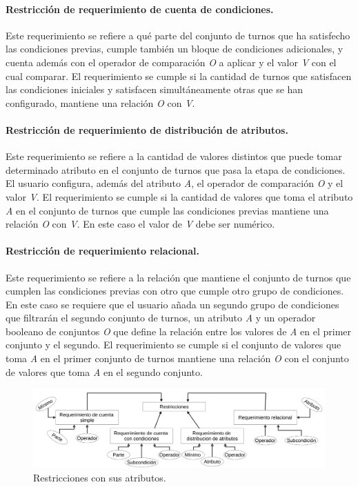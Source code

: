 \paragraph{Restricción de requerimiento de cuenta de condiciones.} Este requerimiento se refiere a qué parte del conjunto de turnos que ha 
 satisfecho las condiciones previas, cumple también un bloque de condiciones adicionales, y cuenta además con el operador de comparación \textit{O} a aplicar y el valor \textit{V} con el cual comparar. El requerimiento se cumple si la cantidad de turnos que satisfacen las condiciones iniciales y satisfacen simultáneamente otras que se han configurado, mantiene una relación \textit{O} con \textit{V}.

\paragraph{Restricción de requerimiento de distribución de atributos.} Este requerimiento se refiere a la cantidad de valores distintos que puede tomar determinado atributo en el conjunto de turnos que pasa la etapa de condiciones. El usuario configura, además del atributo \textit{A}, el operador de comparación \textit{O} y el valor \textit{V}. El requerimiento se cumple si la cantidad de valores que toma el atributo \textit{A} en el conjunto de turnos que cumple las condiciones previas mantiene una relación \textit{O} con  \textit{V}. En este caso el valor de \textit{V} debe ser numérico.

\paragraph{Restricción de requerimiento relacional.} Este requerimiento se refiere a la relación que mantiene el conjunto de turnos que cumplen las condiciones previas con otro que cumple otro grupo de condiciones. En este caso se requiere que el usuario añada un segundo grupo de condiciones que filtrarán el segundo conjunto de turnos, un atributo \textit{A} y un operador booleano de conjuntos \textit{O} que define la relación entre los valores de \textit{A}
en el primer conjunto y el segundo. El requerimiento se cumple si el conjunto de valores que toma \textit{A} en el primer conjunto de turnos mantiene una relación \textit{O} con el conjunto de valores que toma \textit{A} en el segundo conjunto.

\begin{figure}[h!]
	\centering
	\includegraphics[width=0.95\linewidth]{images/Chapter 2/restrictions}
	\caption{Restricciones con sus atributos.}
	\label{fig:restrictions}
\end{figure}


